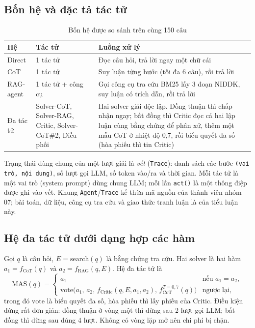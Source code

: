 \subsection{Bốn hệ và đặc tả tác tử}

\begin{table}[H]
\centering
\caption{Bốn hệ được so sánh trên cùng 150 câu}
\label{tab:ch7-systems}
\small
\begin{tabularx}{\linewidth}{@{}L{2.2cm}L{3.6cm}Y@{}}
\toprule
\textbf{Hệ} & \textbf{Tác tử} & \textbf{Luồng xử lý} \\
\midrule
Direct & 1 tác tử & Đọc câu hỏi, trả lời ngay một chữ cái \\
CoT & 1 tác tử & Suy luận từng bước (tối đa 6 câu), rồi trả lời \\
RAG-agent & 1 tác tử + công cụ & Gọi công cụ tra cứu BM25 lấy 3 đoạn NIDDK, suy luận có trích dẫn, rồi trả lời \\
Đa tác tử & Solver-CoT, Solver-RAG, Critic, Solver-CoT\#2, Điều phối & Hai solver giải độc lập. Đồng thuận thì chấp nhận ngay; bất đồng thì Critic đọc cả hai lập luận cùng bằng chứng để phân xử, thêm một mẫu CoT ở nhiệt độ 0,7, rồi biểu quyết đa số (hòa phiếu thì tin Critic) \\
\bottomrule
\end{tabularx}
\end{table}

Trạng thái dùng chung của một lượt giải là \emph{vết} (\texttt{Trace}): danh sách các bước \texttt{(vai trò, nội dung)}, số lượt gọi LLM, số token vào/ra và thời gian. Mỗi tác tử là một vai trò (system prompt) dùng chung LLM; mỗi lần \texttt{act()} là một thông điệp được ghi vào vết. Khung \texttt{Agent}/\texttt{Trace} kế thừa mã nguồn của thành viên nhóm 07; bài toán, dữ liệu, công cụ tra cứu và giao thức tranh luận là của tiểu luận này.

\subsection{Hệ đa tác tử dưới dạng hợp các hàm}

Gọi $q$ là câu hỏi, $E=\mathrm{search}(q)$ là bằng chứng tra cứu. Hai solver là hai hàm $a_1=f_{\mathrm{CoT}}(q)$ và $a_2=f_{\mathrm{RAG}}(q,E)$. Hệ đa tác tử là
\begin{equation}
\mathrm{MAS}(q)=\begin{cases} a_1 & \text{nếu } a_1=a_2,\\ \mathrm{vote}\big(a_1,\,a_2,\,f_{\mathrm{Critic}}(q,E,a_1,a_2),\,f^{T=0{,}7}_{\mathrm{CoT}}(q)\big) & \text{ngược lại,}\end{cases}
\end{equation}
trong đó $\mathrm{vote}$ là biểu quyết đa số, hòa phiếu thì lấy phiếu của Critic. Điều kiện dừng rất đơn giản: đồng thuận ở vòng một thì dừng sau 2 lượt gọi LLM; bất đồng thì dừng sau đúng 4 lượt. Không có vòng lặp mở nên chi phí bị chặn.

